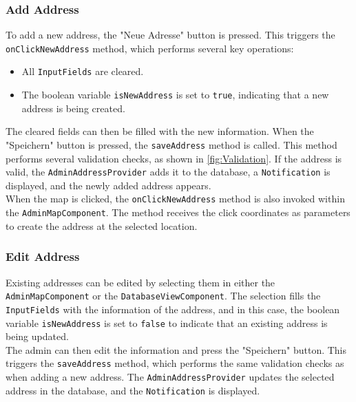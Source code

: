 \newpage

\subsubsection{Add Address}
    \label{fig:Add Address}

    \sloppy
    To add a new address, the "Neue Adresse" button is pressed. This triggers the \texttt{onClickNewAddress} method, which performs several key operations:  

    \begin{itemize}  
        \item All \texttt{InputFields} are cleared.  
        \item The boolean variable \texttt{isNewAddress} is set to \texttt{true}, indicating that a new address is being created.  
    \end{itemize}  
    
    The cleared fields can then be filled with the new information. When the "Speichern" button is pressed, the \texttt{saveAddress} method is called. This method performs several validation checks, as shown in \ref{fig:Validation}. If the address is valid, the \texttt{AdminAddressProvider} adds it to the database, a \texttt{Notification} is displayed, and the newly added address appears.\\
    
    When the map is clicked, the \texttt{onClickNewAddress} method is also invoked within the \texttt{AdminMapComponent}. The method receives the click coordinates as parameters to create the address at the selected location.  
    

\subsubsection{Edit Address}
\sloppy %
Existing addresses can be edited by selecting them in either the \texttt{AdminMapComponent} or the \texttt{DatabaseViewComponent}.
The selection fills the \texttt{InputFields} with the information of the address, and in this case, the boolean variable \texttt{isNewAddress} is set to \texttt{false} to indicate that an existing address is being updated.\\

\sloppy
The admin can then edit the information and press the "Speichern" button. This triggers the \texttt{saveAddress} method, which performs the same validation checks as when adding a new address. The \texttt{AdminAddressProvider} updates the selected address in the database, and the \texttt{Notification} is displayed. \newpage

